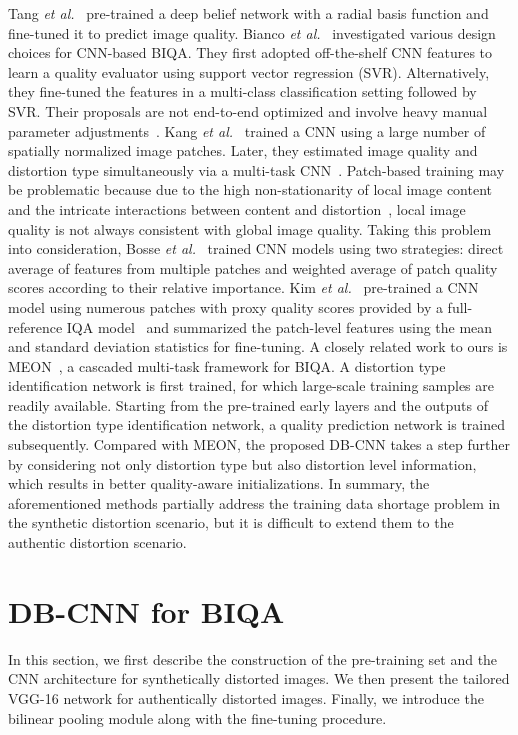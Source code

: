 \documentclass[journal]{IEEEtran}
\begin{document}
Tang \textit{et al.}~\cite{tang2014blind} pre-trained a deep belief network with a radial basis function and fine-tuned it to predict image quality. Bianco \textit{et al.}~\cite{Bianco2016on} investigated
various design choices for CNN-based BIQA. They first adopted off-the-shelf
CNN features to learn a quality evaluator using support vector
regression (SVR). Alternatively, they fine-tuned the features in a multi-class classification setting followed by SVR. Their proposals are not end-to-end optimized
and involve heavy manual parameter adjustments~\cite{Bianco2016on}. Kang \textit{et al.}~\cite{kang2014convolutional} trained a CNN using a large number of spatially normalized image patches.
Later, they estimated image quality and distortion type simultaneously via a multi-task CNN~\cite{Kang2015Simultaneous}. Patch-based training may be problematic because due to the high non-stationarity of local image content and the intricate interactions between content and distortion~\cite{Ma2018End,kim2017deep}, local image quality is not always consistent with global image quality.  Taking this problem into consideration, Bosse \textit{et al.}~\cite{bosse2016deep} trained CNN models using two strategies: direct average of features from multiple patches and weighted average of patch quality scores according to their relative importance. Kim \textit{et al.}~\cite{kim2017fully} pre-trained a CNN model using numerous patches with proxy quality scores provided by a full-reference IQA model~\cite{zhang2011fsim} and summarized the patch-level features using the mean and standard deviation statistics for fine-tuning.
A closely related work to ours is MEON~\cite{Ma2018End}, a cascaded multi-task framework for BIQA. A distortion type identification network is first trained, for which large-scale training samples are readily available. Starting from the pre-trained early layers and the outputs of the distortion type identification network, a quality prediction network is trained subsequently. Compared with MEON, the proposed DB-CNN takes a step further by considering not only distortion type but also distortion level information, which results in better quality-aware initializations. In summary, the aforementioned methods partially address the training data shortage problem in the synthetic distortion scenario, but it is difficult to extend them to the authentic distortion scenario.


\section{DB-CNN for BIQA}\label{sec:dbcnn}
In this section, we first describe the construction of the pre-training set and the CNN architecture for synthetically distorted images. We then present the tailored VGG-16 network for authentically distorted images. Finally, we introduce the bilinear pooling module along with the fine-tuning procedure.
\end{document}
